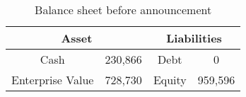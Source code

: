 \begin{table}[ht]
\centering
\begin{tabular}{@{}cccc@{}}
\toprule
\multicolumn{2}{c}{Asset}  & \multicolumn{2}{c}{Liabilities} \\ \midrule
Cash             & 230,866 & Debt           & 0              \\
Enterprise Value & 728,730 & Equity         & 959,596        \\ \bottomrule
\end{tabular}
\caption{Balance sheet before announcement}
\label{tab:bs_before_announcement}
\end{table}

